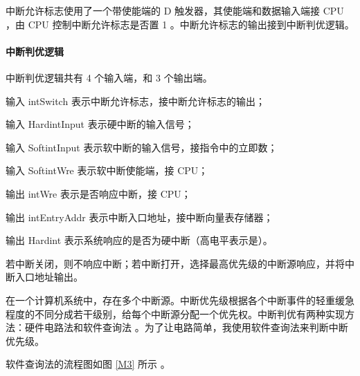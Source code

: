 \documentclass{article}
\begin{document}
中断允许标志使用了一个带使能端的 D 触发器，其使能端和数据输入端接 CPU ，由 CPU 控制中断允许标志是否置 1 。中断允许标志的输出接到中断判优逻辑。

\paragraph{中断判优逻辑}

中断判优逻辑共有 4 个输入端，和 3 个输出端。

输入 intSwitch 表示中断允许标志，接中断允许标志的输出；

输入 HardintInput 表示硬中断的输入信号；

输入 SoftintInput 表示软中断的输入信号，接指令中的立即数；

输入 SoftintWre 表示软中断使能端，接 CPU；

输出 intWre 表示是否响应中断，接 CPU；

输出 intEntryAddr 表示中断入口地址，接中断向量表存储器；

输出 Hardint 表示系统响应的是否为硬中断（高电平表示是）。

若中断关闭，则不响应中断；若中断打开，选择最高优先级的中断源响应，并将中断入口地址输出。

在一个计算机系统中，存在多个中断源。中断优先级根据各个中断事件的轻重缓急程度的不同分成若干级别，给每个中断源分配一个优先权。中断判优有两种实现方法：硬件电路法和软件查询法 \cite{COD2} 。为了让电路简单，我使用软件查询法来判断中断优先级。

软件查询法的流程图如图 \ref{M3} 所示 \cite{COD2} 。

\end{document}
